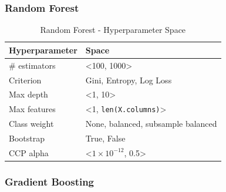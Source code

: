         \subsubsection{Random Forest}
        
        \begin{table}[H]
            \small
            \setlength{\tabcolsep}{8pt}
            \renewcommand{\arraystretch}{1.3}
            \centering
                \caption[Random Forest - Hyperparameter Space]{Random Forest - Hyperparameter Space}\label{tab:rfspace}
                \begin{tabular}{ll}
            \toprule
            \textbf{Hyperparameter} & \textbf{Space}\\
            \midrule
            \hline
            \# estimators & <100, 1000> \\
            Criterion & Gini, Entropy, Log Loss \\
            Max depth & <1, 10> \\
            Max features & <1, \verb|len(X.columns)|>  \\
            Class weight & None, balanced, subsample balanced \\
            Bootstrap & True, False \\
            CCP alpha & <$1 \times 10^{-12}$, 0.5> \\
            \hline
            \bottomrule
            \end{tabular}
            \vspace{0.7em}
        
            \vspace{-1em}
        \end{table}
        
        \subsubsection{Gradient Boosting}
        
